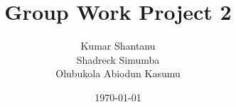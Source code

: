 \begin{titlepage}
    

\title{\Huge Group Work Project 2}
\author{Kumar Shantanu \\
Shadreck Simumba \\
Olubukola Abiodun Kasumu}
\date{\today}
\maketitle


\end{titlepage}
\newpage